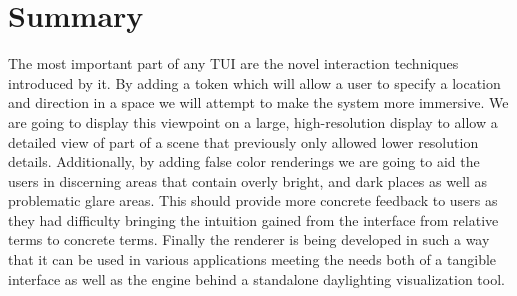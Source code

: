 \section{Summary}
The most important part of any TUI are the novel interaction techniques introduced by it.  By adding a token which will allow a user to specify a location and direction in a space we will attempt to make the system more immersive.  We are going to display this viewpoint on a large, high-resolution display to allow a detailed view of part of a scene that previously only allowed lower resolution details.  Additionally, by adding false color renderings we are going to aid the users in discerning areas that contain overly bright, and dark places as well as problematic glare areas.  This should provide more concrete feedback to users as they had difficulty bringing the intuition gained from the interface from relative terms to concrete terms.  Finally the renderer is being developed in such a way that it can be used in various applications meeting the needs both of a tangible interface as well as the engine behind a standalone daylighting visualization tool.
